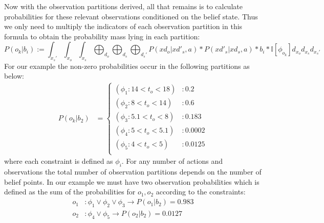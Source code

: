 \documentclass{article} %
\begin{document}
Now with the observation partitions derived, all that remains is to
calculate probabilities for these relevant observations conditioned on
the belief state. 
% 
Thus we only need to multiply the indicators of each observation partition 
in this formula to obtain the probability mass lying in each
partition:
$$P(o_k|b_i) := \int_{x_s'}\int_{x_o}\int_{x_s} \bigoplus_{d_o} \bigoplus_{d_s} \bigoplus_{d_s'} P(xd_o|xd'_s,a)*P(xd'_s|xd_s,a)*b_i* \mathbb{I}[\phi_{o_k}] d_{x_o} d_{x_s}d_{x_s'}$$
For our example the non-zero probabilities occur in the following partitions as below:
{\footnotesize
\vspace{-2mm}
\begin{align}
P(o_k|b_2) &= 
\begin{cases}
(\phi_1 : 14 < t_o< 18) & : 0.2\\
(\phi_2 : 8 < t_o< 14) & :  0.6\\
(\phi_3 : 5.1 < t_o< 8) & : 0.183\\
(\phi_4 : 5 < t_o< 5.1) & : 0.0002\\
(\phi_5 : 4 < t_o< 5) & :  0.0125\\
\end{cases}
\nonumber
\end{align}
}
where each constraint is defined as $\phi_i$. For any number of actions and observations the total number of observation partitions depends on the number of belief points. In our example we must have two observation probabilities which is defined as the sum of the probabilities for $o_1,o_2$ according to the constraints: 
\begin{align*}
o_1&: \phi_1 \vee \phi_2 \vee \phi_3 \longrightarrow P(o_1|b_2)=0.983 \\
o_2&: \phi_4 \vee \phi_5  \longrightarrow P(o_2|b_2)=0.0127
\end{align*}
\end{document}
